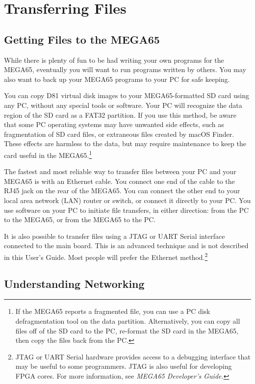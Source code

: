 \chapter{Transferring Files}

\section{Getting Files to the MEGA65}
\label{cha:transferring-files}

While there is plenty of fun to be had writing your own programs for the MEGA65, eventually you will want to run programs written by others. You may also want to back up your MEGA65 programs to your PC for safe keeping.

You can copy D81 virtual disk images to your MEGA65-formatted SD card using any PC, without any special tools or software. Your PC will recognize the data region of the SD card as a FAT32 partition. If you use this method, be aware that some PC operating systems may have unwanted side effects, such as fragmentation of SD card files, or extraneous files created by macOS Finder. These effects are harmless to the data, but may require maintenance to keep the card useful in the MEGA65.\footnote{If the MEGA65 reports a fragmented file, you can use a PC disk defragmentation tool on the data partition. Alternatively, you can copy all files off of the SD card to the PC, re-format the SD card in the MEGA65, then copy the files back from the PC.}

The fastest and most reliable way to transfer files between your PC and your MEGA65 is with an Ethernet cable. You connect one end of the cable to the RJ45 jack on the rear of the MEGA65. You can connect the other end to your local area network (LAN) router or switch, or connect it directly to your PC. You use software on your PC to initiate file transfers, in either direction: from the PC to the MEGA65, or from the MEGA65 to the PC.

It is also possible to transfer files using a JTAG or UART Serial interface connected to the main board. This is an advanced technique and is not described in this User's Guide. Most people will prefer the Ethernet method.\footnote{JTAG or UART Serial hardware provides access to a debugging interface that may be useful to some programmers. JTAG is also useful for developing FPGA cores. For more information, see {\it MEGA65 Developer's Guide.}}

\section{Understanding Networking}

